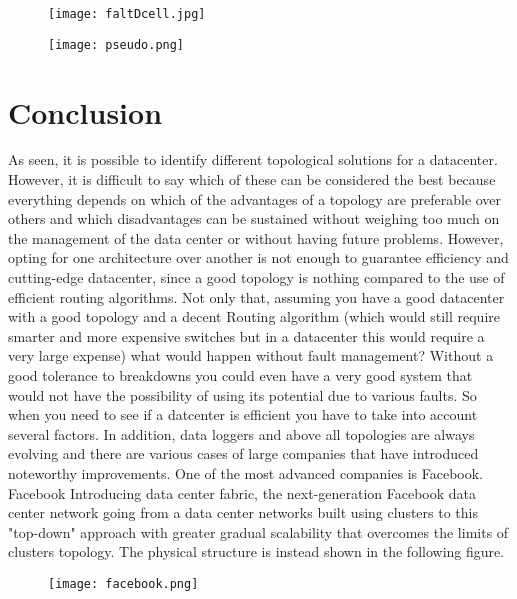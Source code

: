 \documentclass[]{article}
\begin{document}
\begin{figure}[htbp]
	\begin{minipage}{.40\textwidth}
			\centering
	\texttt{[image: faltDcell.jpg]}	
\end{minipage}
		\hspace{1.3 cm}
	\begin{minipage}{.40\textwidth}
	\centering
	\texttt{[image: pseudo.png]}	
\end{minipage}
\end{figure}


\section{Conclusion}
As seen, it is possible to identify different topological solutions for a datacenter. However, it is difficult to say which of these can be considered the best because everything depends on which of the advantages of a topology are preferable over others and which disadvantages can be sustained without weighing too much on the management of the data center or without having future problems.
However, opting for one architecture over another is not enough to guarantee efficiency and cutting-edge datacenter, since a good topology is nothing compared to the use of efficient routing algorithms. Not only that, assuming you have a good datacenter with a good topology and a decent Routing algorithm (which would still require smarter and more expensive switches but in a datacenter this would require a very large expense) what would happen without fault management? Without a good tolerance to breakdowns you could even have a very good system that would not have the possibility of using its potential due to various faults.
So when you need to see if a datcenter is efficient you have to take into account several factors.
In addition, data loggers and above all topologies are always evolving and there are various cases of large companies that have introduced noteworthy improvements. One of the most advanced companies is Facebook. Facebook Introducing data center fabric, the next-generation Facebook data center network going from a data center networks built using clusters to this "top-down" approach with greater gradual scalability that overcomes the limits of clusters topology. The physical structure is instead shown in the following figure.
\begin{center}
	\begin{figure}[htbp]
		\centering
		\texttt{[image: facebook.png]}	
	\end{figure}
\end{center}
\end{document}
